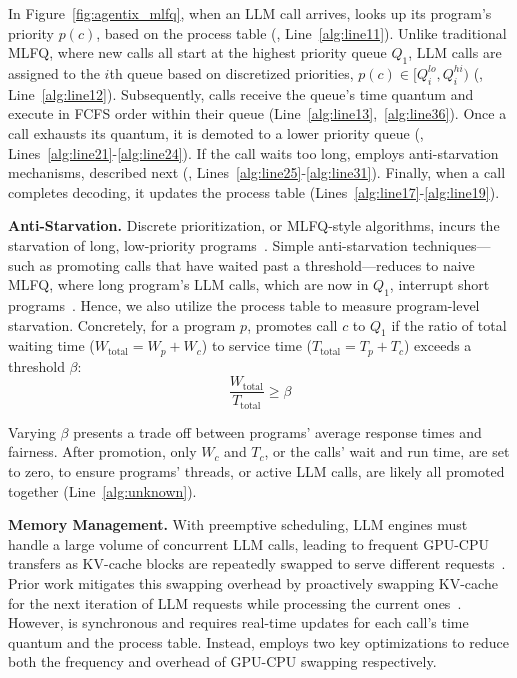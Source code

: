 In Figure~\ref{fig:agentix_mlfq}, when an LLM call arrives, \text{\name} looks up its program’s priority $p(c)$, based on the process table (, Line~\ref{alg:line11}). Unlike traditional MLFQ, where new calls all start at the highest priority queue $Q_1$, LLM calls are assigned to the $i$th queue based on discretized priorities, $p(c)\in[Q_i^{lo}, Q_i^{hi})$ (, Line~\ref{alg:line12}). Subsequently, calls receive the queue's time quantum and execute in FCFS order within their queue (Line~\ref{alg:line13},~\ref{alg:line36}).
Once a call exhausts its quantum, it is demoted to a lower priority queue (, Lines~\ref{alg:line21}-\ref{alg:line24}). If the call waits too long, \text{\name} employs anti-starvation mechanisms, described next (, Lines~\ref{alg:line25}-\ref{alg:line31}). Finally, when a call completes decoding, it updates the process table (Lines~\ref{alg:line17}-\ref{alg:line19}).

\vspace{1mm}
\noindent \textbf{Anti-Starvation.} Discrete prioritization, or MLFQ-style algorithms, incurs the starvation of long, low-priority programs~\cite{tiresias, fastserve, coflow_dag}. Simple anti-starvation techniques—such as promoting calls that have waited past a threshold—reduces \text{\name} to naive MLFQ, where long program's LLM calls, which are now in $Q_1$, interrupt short programs~\cite{fastserve, arps_ostep_mlfq}. Hence, we also utilize the process table to measure program-level starvation. Concretely, for a program $p$, \text{\name} promotes call $c$ to $Q_1$ if the ratio of total waiting time ($W_\text{total} = W_p + W_c$) to service time ($T_\text{total} = T_p + T_c$) exceeds a threshold $\beta$:
\vspace{-2mm}
\[ \frac{W_{\text{total}}}{T_{\text{total}}} \geq \beta \]
\vspace{-3mm}

\noindent Varying $\beta$ presents a trade off between programs' average response times and fairness. After promotion, only $W_c$ and $T_c$, or the calls' wait and run time, are set to zero, to ensure programs' threads, or active LLM calls, are likely all promoted together (Line~\ref{alg:unknown}). 

\vspace{1mm}
\noindent \textbf{Memory Management.} With preemptive scheduling, LLM engines must handle a large volume of concurrent LLM calls, leading to frequent GPU-CPU transfers as KV-cache blocks are repeatedly swapped to serve different requests~\cite{fastserve}. Prior work mitigates this swapping overhead by proactively swapping KV-cache for the next iteration of LLM requests while processing the current ones~\cite{fastserve}. However, \text{\name} is synchronous and requires real-time updates for each call's time quantum and the process table. Instead, \text{\name} employs two key optimizations to reduce both the frequency and overhead of GPU-CPU swapping respectively.

